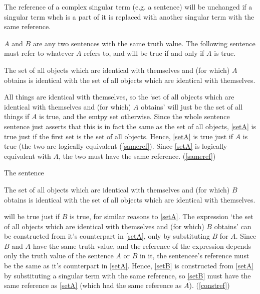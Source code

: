 	
	\begin{thesis} \label{constref}
	The reference of a complex singular term (e.g. 
a sentence) will be unchanged if a singular term whch is a part of it is replaced with another singular term with the same reference.
	\end{thesis}
	
$A$ and $B$ are any two sentences with the same truth value. 
The following sentence must refer to whatever $A$ refers to, and will be true if and only if $A$ is true.


	\begin{example} \label{setA}
	The set of all objects which are identical with themselves and (for which) $A$ obtains is identical with the set of all objects which are identical with themselves.
	\end{example}

All things are identical with themselves, so the `set of all objects which are identical with themselves and (for which) $A$ obtains' will just be the set of all things if $A$ is true, and the emtpy set otherwise.
Since the whole sentence sentence just asserts that this is in fact the same as the set of all objects, \ref{setA} is true just if the first set is the set of all objects.
Hence, \ref{setA} is true just if $A$ is true (the two are logically equivalent (\ref{sameref}).
Since \ref{setA} is logically equivalent with $A$, the two must have the same reference. 
(\ref{sameref})

The sentence 

	\begin{example} \label{setB}
	The set of all objects which are identical with themselves and (for which) $B$ obtains is identical with the set of all objects which are identical with themselves.
	\end{example}

will be true just if $B$ is true, for similar reasons to \ref{setA}.
The expression `the set of all objects which are identical with themselves and (for which) $B$ obtains' can be constructed from it's counterpart in \ref{setA}, only by substituting $B$ for $A$.
Since $B$ and $A$ have the same truth value, and the reference of the expression depends only the truth value of the sentence $A$ or $B$ in it, the sentencee's reference must be the same as it's counterpart in \ref{setA}.
Hence, \ref{setB} is constructed from \ref{setA} by substituting a singular term with the same reference, so \ref{setB} must have the same reference as \ref{setA} (which had the same reference as $A$). 
(\ref{constref})

